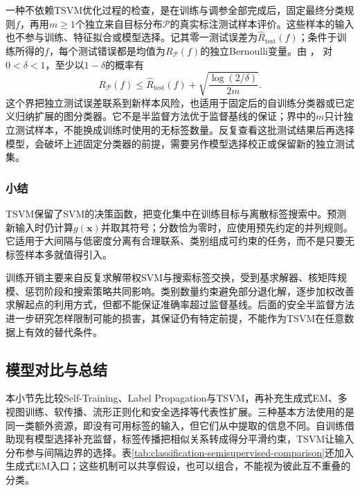 一种不依赖TSVM优化过程的检查，是在训练与调参全部完成后，固定最终分类规则$f$，再用$m\geq1$个独立来自目标分布$\mathcal{P}$的真实标注测试样本评价。这些样本的输入也不参与训练、特征拟合或模型选择。记其零一测试误差为$\widehat R_{\mathrm{test}}(f)$；条件于训练所得的$f$，每个测试错误都是均值为$R_{\mathcal{P}}(f)$的独立Bernoulli变量。由
，
对$0<\delta<1$，至少以$1-\delta$的概率有
\begin{equation}
  \label{eq:classification-semisupervised-test-risk}
  R_{\mathcal{P}}(f)
    \leq\widehat R_{\mathrm{test}}(f)
       +\sqrt{\frac{\log(2/\delta)}{2m}}.
\end{equation}
这个界把独立测试误差联系到新样本风险，也适用于固定后的自训练分类器或已定义归纳扩展的图分类器。它不是半监督方法优于监督基线的保证；界中的$m$只计独立测试样本，不能换成训练时使用的无标签数量。反复查看这批测试结果后再选择模型，会破坏上述固定分类器的前提，需要另作模型选择校正或保留新的独立测试集。

\subsubsection{小结}
\label{sec:classification-tsvm-summary}

TSVM保留了SVM的决策函数，把变化集中在训练目标与离散标签搜索中。预测新输入时仍计算$g(\bm{x})$并取其符号；分数恰为零时，应使用预先约定的并列规则。它适用于大间隔与低密度分离有合理联系、类别组成可约束的任务，而不是只要无标签样本多就值得引入。

训练开销主要来自反复求解带权SVM与搜索标签交换，受到基求解器、核矩阵规模、惩罚阶段和搜索策略共同影响。类别数量约束避免部分退化解，逐步加权改善求解起点的利用方式，但都不能保证准确率超过监督基线。后面的安全半监督方法进一步研究怎样限制可能的损害，其保证仍有特定前提，不能作为TSVM在任意数据上有效的替代条件。

\subsection{模型对比与总结}
\label{sec:classification-semisupervised-comparison}

本小节先比较Self-Training、Label Propagation与TSVM，再补充生成式EM、多视图训练、软传播、流形正则化和安全选择等代表性扩展。三种基本方法使用的是同一类额外资源，即没有可用标签的输入，但它们从中提取的信息不同。自训练借助现有模型选择补充监督，标签传播把相似关系转成得分平滑约束，TSVM让输入分布参与间隔边界的选择。表\ref{tab:classification-semisupervised-comparison}还加入生成式EM入口；这些机制可以共享假设，也可以组合，不能视为彼此互不重叠的分类。

